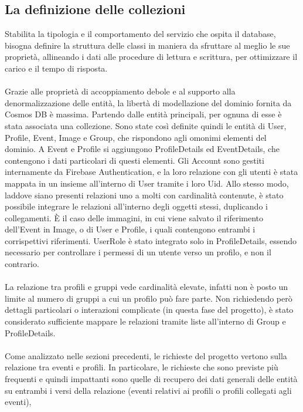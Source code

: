 \subsection{La definizione delle collezioni}

Stabilita la tipologia e il comportamento del servizio che ospita il database,
bisogna definire la struttura delle classi in maniera da sfruttare al meglio le sue proprietà,
allineando i dati alle procedure di lettura e scrittura,
per ottimizzare il carico e il tempo di risposta.\\
\\
Grazie alle proprietà di accoppiamento debole e al supporto alla denormalizzazione delle entità,
la libertà di modellazione del dominio fornita da Cosmos DB è massima.
Partendo dalle entità principali, per ognuna di esse è stata associata una collezione.
Sono state così definite quindi le entità di User, Profile, Event, Image e Group,
che rispondono agli omonimi elementi del dominio.
A Event e Profile si aggiungono ProfileDetails ed EventDetails,
che contengono i dati particolari di questi elementi.
Gli Account sono gestiti internamente da Firebase Authentication,
e la loro relazione con gli utenti è stata mappata in un insieme all'interno di User
tramite i loro Uid.
Allo stesso modo, laddove siano presenti relazioni uno a molti con cardinalità contenute,
è stato possibile integrare le relazioni all'interno degli oggetti stessi, duplicando i collegamenti.
È il caso delle immagini, in cui viene salvato il riferimento dell'Event in Image,
o di User e Profile, i quali contengono entrambi i corrispettivi riferimenti.
UserRole è stato integrato solo in ProfileDetails,
essendo necessario per controllare i permessi di un utente verso un profilo, e non il contrario.\\
\\
La relazione tra profili e gruppi vede cardinalità elevate,
infatti non è posto un limite al numero di gruppi a cui un profilo può fare parte.
Non richiedendo però dettagli particolari o interazioni complicate (in questa fase del progetto),
è stato considerato sufficiente mappare le relazioni tramite liste all'interno di Group e ProfileDetails.\\
\\
Come analizzato nelle sezioni precedenti,
le richieste del progetto vertono sulla relazione tra eventi e profili.
In particolare, le richieste che sono previste più frequenti e quindi impattanti
sono quelle di recupero dei dati generali delle entità su entrambi i versi della relazione
(eventi relativi ai profili o profili collegati agli eventi),
